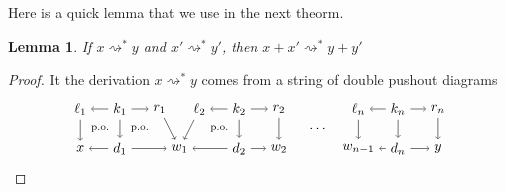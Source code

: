 \documentclass{amsart}
\newcommand{\deriv}[2]{#1 \rightsquigarrow^\ast #2}
\newtheorem{lemma}[theorem]{Lemma}
\theoremstyle{remark}
\theoremstyle{definition}
\begin{document}
Here is a quick lemma that we use in the next theorm.

\begin{lemma}
\label{thm:rewrite-rel-is-additive}
  If $ \deriv{x}{y} $ and $ \deriv{x'}{y'} $, then $ \deriv{x+x'}{y+y'} $
\end{lemma}

\begin{proof}
  It the derivation $ \deriv{x}{y} $ comes from a string of double
  pushout diagrams
  \[
    \begin{tikzpicture}
      \node (1t) at (0,1) {$ \ell_1 $};
      \node (2t) at (1,1) {$ k_1 $};
      \node (3t) at (2,1) {$ r_1 $};
      \node (4t) at (3,1) {$ \ell_2 $};
      \node (5t) at (4,1) {$ k_2 $};
      \node (6t) at (5,1) {$ r_2 $};
      \node (7t) at (7,1) {$ \ell_n $};
      \node (8t) at (8,1) {$ k_n $};
      \node (9t) at (9,1) {$ r_n $};
      \node (1b) at (0,0) {$ x $};
      \node (2b) at (1,0) {$ d_1 $};
      \node (3b) at (2.5,0) {$ w_1 $};
      \node (4b) at (4,0) {$ d_2 $};
      \node (5b) at (5,0) {$ w_2 $};
      \node (6b) at (7,0) {$ w_{n-1} $};
      \node (7b) at (8,0) {$ d_n $};
      \node (8b) at (9,0) {$ y $};
      \draw [->] (2t) to node [] {\scriptsize{$  $}} (1t);
      \draw [->] (2t) to node [] {\scriptsize{$  $}} (3t);
      \draw [->] (5t) to node [] {\scriptsize{$  $}} (4t);
      \draw [->] (5t) to node [] {\scriptsize{$  $}} (6t);
      \draw [->] (8t) to node [] {\scriptsize{$  $}} (7t);
      \draw [->] (8t) to node [] {\scriptsize{$  $}} (9t);
      \draw [->] (2b) to node [] {\scriptsize{$  $}} (1b);
      \draw [->] (2b) to node [] {\scriptsize{$  $}} (3b);
      \draw [->] (4b) to node [] {\scriptsize{$  $}} (3b);
      \draw [->] (4b) to node [] {\scriptsize{$  $}} (5b);
      \draw [->] (7b) to node [] {\scriptsize{$  $}} (6b);
      \draw [->] (7b) to node [] {\scriptsize{$  $}} (8b);
      \draw [->] (1t) to node [] {\scriptsize{$  $}} (1b);
      \draw [->] (2t) to node [] {\scriptsize{$  $}} (2b);
      \draw [->] (3t) to node [] {\scriptsize{$  $}} (3b);
      \draw [->] (4t) to node [] {\scriptsize{$  $}} (3b);
      \draw [->] (5t) to node [] {\scriptsize{$  $}} (4b);
      \draw [->] (6t) to node [] {\scriptsize{$  $}} (5b);
      \draw [->] (7t) to node [] {\scriptsize{$  $}} (6b);
      \draw [->] (8t) to node [] {\scriptsize{$  $}} (7b);
      \draw [->] (9t) to node [] {\scriptsize{$  $}} (8b);
      \node () at (6,0.5) {$ \dotsm $};
      \node () at (0.5,0.5) {\scriptsize{p.o.}};
      \node () at (1.5,0.5) {\scriptsize{p.o.}};
      \node () at (3.5,0.5) {\scriptsize{p.o.}};

\end{tikzpicture}\]
\end{proof}
\end{document}
